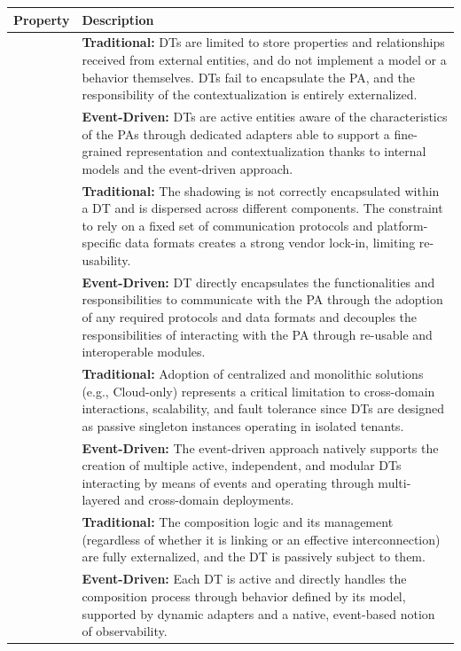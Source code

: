 \begin{table}[hp]
\renewcommand{\arraystretch}{1.2}
\centering
\small
\begin{tabularx}{\textwidth}{>{\arraybackslash}m{2.5cm} >{\arraybackslash}X}
\hline
\textbf{Property} & \textbf{Description} \\ \hline

\multirow{2}{*}{\parbox[t]{2.8cm}{\raggedright\arraybackslash\hspace{0pt}\textbf{Representativeness \& Contextualization}}}
& \textbf{Traditional:} DTs are limited to store properties and relationships received from external entities, and do not implement a model or a behavior themselves. DTs fail to encapsulate the PA, and the responsibility of the contextualization is entirely externalized. \\
& \textbf{Event-Driven:} DTs are active entities aware of the characteristics of the PAs through dedicated adapters able to support a fine-grained representation and contextualization thanks to internal models and the event-driven approach. \\ \hline

\multirow{2}{*}{\textbf{Shadowing}} 
& \textbf{Traditional:} The shadowing is not correctly encapsulated within a DT and is dispersed across different components. The constraint to rely on a fixed set of communication protocols and platform-specific data formats creates a strong vendor lock-in, limiting re-usability. \\
& \textbf{Event-Driven:} DT directly encapsulates the functionalities and responsibilities to communicate with the PA through the adoption of any required protocols and data formats and decouples the responsibilities of interacting with the PA through re-usable and interoperable modules. \\ \hline

\multirow{2}{*}{\textbf{Replication}} 
& \textbf{Traditional:} Adoption of centralized and monolithic solutions (e.g., Cloud-only) represents a critical limitation to cross-domain interactions, scalability, and fault tolerance since DTs are designed as passive singleton instances operating in isolated tenants. \\
& \textbf{Event-Driven:} The event-driven approach natively supports the creation of multiple active, independent, and modular DTs interacting by means of events and operating through multi-layered and cross-domain deployments. \\ \hline

\multirow{2}{*}{\textbf{Composability}} 
& \textbf{Traditional:} The composition logic and its management (regardless of whether it is linking or an effective interconnection) are fully externalized, and the DT is passively subject to them. \\
& \textbf{Event-Driven:} Each DT is active and directly handles the composition process through behavior defined by its model, supported by dynamic adapters and a native, event-based notion of observability. \\ \hline


\end{tabularx}
\end{table}
